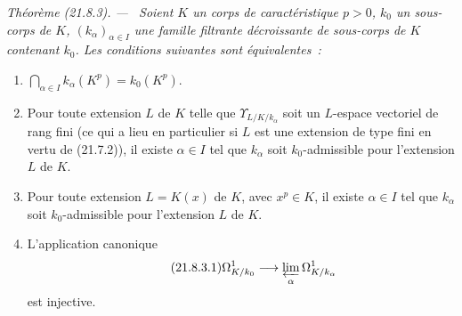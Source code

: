 \documentclass[10pt,oneside]{book}
\makeatletter
\newcommand{\setmanualcurrentlabel}[1]{\def\@currentlabel{#1}}
\newenvironment{theorem}[1][]{%
  \setmanualcurrentlabel{#1}\par\medskip\noindent\itshape Théorème (#1). ---\ }{\par}
\makeatother
\begin{document}
\begin{theorem}[21.8.3]
\label{0.21.8.3-fr}
Soient $K$ un corps de caractéristique $p>0$, $k_0$ un sous-corps de $K$,
$(k_\alpha)_{\alpha\in I}$ une famille filtrante décroissante de sous-corps
de $K$ contenant $k_0$. Les conditions suivantes sont équivalentes~:
\begin{enumerate}
  \item[\rm a)] $\bigcap_{\alpha\in I}k_\alpha(K^p)=k_0(K^p)$.
  \item[\rm b)] Pour toute extension $L$ de $K$ telle que
  $\Upsilon_{L/K/k_\alpha}$ soit un $L$-espace vectoriel de rang fini
  (ce qui a lieu en particulier si $L$ est une extension de type fini en
  vertu de (21.7.2)), il existe $\alpha\in I$ tel que $k_\alpha$ soit
  $k_0$-admissible pour l'extension $L$ de $K$.
  \item[\rm b$'$)] Pour toute extension $L=K(x)$ de $K$, avec $x^p\in K$,
  il existe $\alpha\in I$ tel que $k_\alpha$ soit $k_0$-admissible pour
  l'extension $L$ de $K$.
  \item[\rm c)] L'application canonique
\begin{equation}
\tag{21.8.3.1}
\label{0.21.8.3.1-fr}
\Omega^1_{K/k_0}\longrightarrow\varprojlim_{\alpha}\Omega^1_{K/k_\alpha}
\end{equation}
est injective.
\end{enumerate}
\end{theorem}
\end{document}

